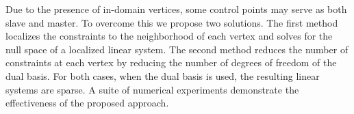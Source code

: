 Due to the presence of in-domain vertices, some control points may serve as both slave and master. To overcome this we propose two solutions. The first method localizes the constraints to the neighborhood of each vertex and solves for the null space of a localized linear system. The second method reduces the number of constraints at each vertex by reducing the number of degrees of freedom of the dual basis. For both cases, when the \Bezier dual basis is used, the resulting linear systems are sparse. A suite of numerical experiments demonstrate the effectiveness of the proposed approach. \par

\clearpage\null\newpage